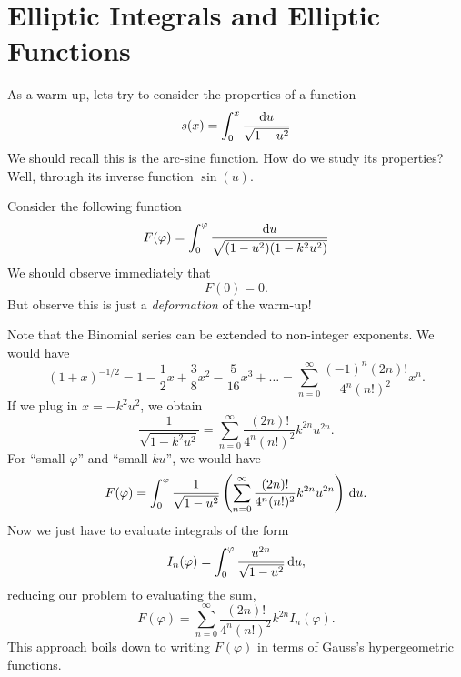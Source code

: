 
\section{Elliptic Integrals and Elliptic Functions}
\M
As a warm up, lets try to consider the properties of a function
\begin{equation}
s(x)=\int^{x}_{0}\frac{\mathrm{d} u}{\sqrt{1-u^{2}}}
\end{equation}
We should recall this is the arc-sine function. How do we study
its properties? Well, through its inverse function $\sin(u)$.

\M
Consider the following function
\begin{equation}
F(\varphi) =
\int^{\varphi}_{0}\frac{\mathrm{d} u}{\sqrt{(1-u^{2})(1-k^{2}u^{2})}}
\end{equation}
We should observe immediately that
\begin{equation}
F(0)=0.
\end{equation}
But observe this is just a \emph{deformation} of the warm-up!

\M
Note that the Binomial series can be extended to non-integer exponents.
We would have
\begin{equation}
(1 + x)^{-1/2} = 1 - \frac{1}{2}x + \frac{3}{8}x^{2} - \frac{5}{16}x^{3} +\dots
= \sum^{\infty}_{n=0}\frac{(-1)^{n}(2n)!}{4^{n}(n!)^{2}}x^{n}.
\end{equation}
If we plug in $x=-k^{2}u^{2}$, we obtain
\begin{equation}
\frac{1}{\sqrt{1 - k^{2}u^{2}}} = \sum^{\infty}_{n=0}\frac{(2n)!}{4^{n}(n!)^{2}}k^{2n}u^{2n}.
\end{equation}
For ``small $\varphi$'' and ``small $ku$'', we would have
\begin{equation}
F(\varphi) = \int^{\varphi}_{0}\frac{1}{\sqrt{1-u^{2}}}\left(\sum^{\infty}_{n=0}\frac{(2n)!}{4^{n}(n!)^{2}}k^{2n}u^{2n}\right)\,\mathrm{d} u.
\end{equation}
Now we just have to evaluate integrals of the form
\begin{equation}
I_{n}(\varphi) = \int^{\varphi}_{0}\frac{u^{2n}}{\sqrt{1 - u^{2}}}\,\mathrm{d} u,
\end{equation}
reducing our problem to evaluating the sum,
\begin{equation}
F(\varphi) = \sum^{\infty}_{n=0}\frac{(2n)!}{4^{n}(n!)^{2}}k^{2n}I_{n}(\varphi).
\end{equation}
This approach boils down to writing $F(\varphi)$ in terms of Gauss's
hypergeometric functions.
